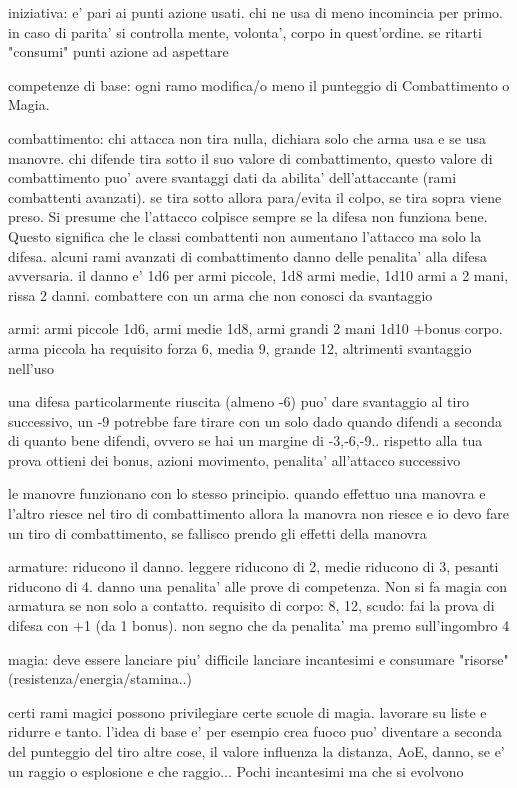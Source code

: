 \documentclass[12pt,a4paper,twoside,openany]{book}
\begin{document}
iniziativa: e' pari ai punti azione usati. chi ne usa di meno incomincia per primo. in caso di parita' si controlla mente, volonta', corpo in quest'ordine. se ritarti "consumi" punti azione ad aspettare

competenze di base: ogni ramo modifica/o meno il punteggio di Combattimento o Magia.

combattimento: chi attacca non tira nulla, dichiara solo che arma usa e se usa manovre. chi difende tira sotto il suo valore di combattimento, questo valore di combattimento puo' avere svantaggi dati da abilita' dell'attaccante (rami combattenti avanzati). se tira sotto allora para/evita il colpo, se tira sopra viene preso.
Si presume che l'attacco colpisce sempre se la difesa non funziona bene. Questo significa che le classi combattenti non aumentano l'attacco ma solo la difesa. alcuni rami avanzati di combattimento danno delle penalita' alla difesa avversaria.
il danno e' 1d6 per armi piccole, 1d8 armi medie, 1d10 armi a 2 mani, rissa 2 danni.
combattere con un arma che non conosci da svantaggio


armi: armi piccole 1d6, armi medie 1d8, armi grandi 2 mani 1d10 +bonus corpo. arma piccola ha requisito forza 6, media 9, grande 12, altrimenti svantaggio nell'uso

una difesa particolarmente riuscita (almeno -6) puo' dare svantaggio al tiro successivo, un -9 potrebbe fare tirare con un solo dado
quando difendi  a seconda di quanto bene difendi, ovvero se hai un margine di -3,-6,-9.. rispetto alla tua prova ottieni dei bonus, azioni movimento, penalita' all'attacco successivo

le manovre funzionano con lo stesso principio. quando effettuo una manovra e l'altro riesce nel tiro di combattimento allora la manovra non riesce e io devo fare un tiro di combattimento, se fallisco prendo gli effetti della manovra

armature: riducono il danno. leggere riducono di 2, medie riducono di 3, pesanti riducono di 4. danno una penalita' alle prove di competenza. Non si fa magia con armatura se non solo a contatto. requisito di corpo: 8, 12, 
scudo: fai la prova di difesa con +1 (da 1 bonus). non segno che da penalita' ma premo sull'ingombro 4


magia: deve essere lanciare piu' difficile lanciare incantesimi e consumare "risorse" (resistenza/energia/stamina..)

certi rami magici possono privilegiare certe scuole di magia. lavorare su liste e ridurre e tanto. l'idea di base e' per esempio crea fuoco puo' diventare a seconda del punteggio del tiro altre cose, il valore influenza la distanza, AoE, danno, se e' un raggio o esplosione e che raggio...  Pochi incantesimi ma che si evolvono
\end{document}
